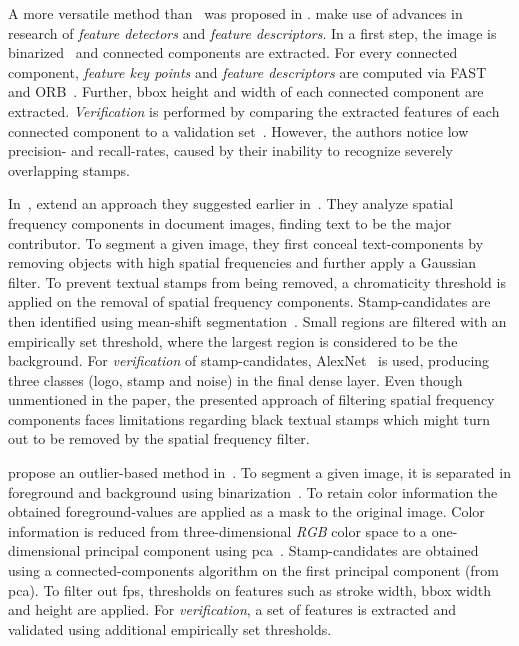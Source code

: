 \begin{description}[font={\color{red!50!black}\ttfamily}]
    \item[Geometric features]
    A more versatile method than~\cite{Zhu.2006} was proposed in
    \cite{Ahmed.2013, Ahmed.2016}.
    \citeauthor*{Ahmed.2013} make use of advances in research of \textit{feature detectors}
    and \textit{feature descriptors}. In a first step, the image is
    binarized~\cite{Tensmeyer.2020} and connected components are extracted.
    For every connected component, \textit{feature key points} and \textit{feature descriptors}
    are computed via FAST~\cite{Rosten.2005} and ORB~\cite{Rublee.2011}.
    Further, \gls{bbox} height and width of each connected component
    are extracted. \textit{Verification} is performed by comparing the extracted
    features of each connected component to a validation set~\cite[120\psq]{Goodfellow.2016}.
    However, the authors notice low precision- and recall-rates, caused by their inability
    to recognize severely overlapping stamps.

    In~\cite{Nandedkar.2015b}, \citeauthor*{Nandedkar.2015b} extend an approach
    they suggested earlier in~\cite{Nandedkar.2015}. They analyze spatial
    frequency components in document images, finding text to be the major
    contributor. To segment a given image, they first conceal
    text-components by removing objects with high spatial frequencies and
    further apply a Gaussian filter. To prevent textual stamps from being
    removed, a chromaticity threshold is applied on the removal of spatial
    frequency components. Stamp-candidates are then identified using mean-shift
    segmentation~\cite{Fukunaga.1975}. Small regions are filtered
    with an empirically set threshold, where the largest region is considered
    to be the background. For \textit{verification} of stamp-candidates,
    AlexNet~\cite{Krizhevsky.2012} is used, producing three classes
    (logo, stamp and noise) in the final \gls{dense layer}. Even though unmentioned
    in the paper, the presented approach of filtering spatial frequency
    components faces limitations regarding black textual stamps which might
    turn out to be removed by the spatial frequency filter.
    \item[Mixed features]
    \citeauthor*{Dey.2015} propose an outlier-based
    method in~\cite{Dey.2015}. To segment a given image,
    it is separated in foreground and background using binarization~\cite{Tensmeyer.2020}.
    To retain color information the obtained foreground-values are applied as
    a mask to the original image. Color information is reduced from
    three-dimensional \textit{RGB} color space to a one-dimensional principal
    component using \gls{pca}~\cite{Hotelling.1933}.
    Stamp-candidates are obtained using a connected-components algorithm on
    the first principal component (from \gls{pca}). To filter out \glspl{fp},
    thresholds on features such as stroke width, \gls{bbox} width and
    height are applied. For \textit{verification}, a set of features is extracted and
    validated using additional empirically set thresholds.


\end{description}
